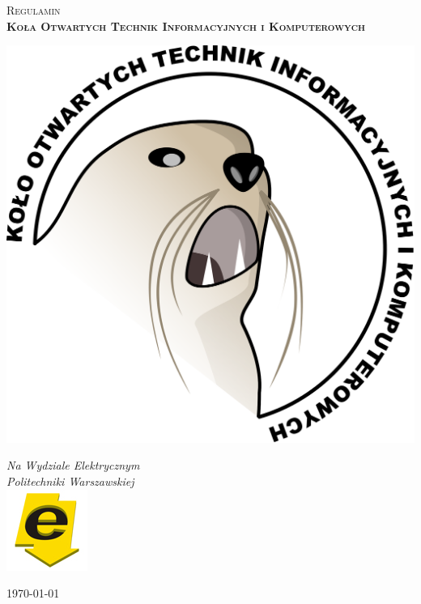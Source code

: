 \documentclass[a4paper,11pt]{article}
\begin{document}
\begin{titlepage}

\begin{center}
	\vspace{20pt}
	\begin{doublespace}
		\begin{huge}
			\textsc{Regulamin \\ \textbf{Koła Otwartych Technik Informacyjnych i Komputerowych}}
		\end{huge}
	\end{doublespace}
	
	\vspace{40pt}
	
	\includegraphics[scale=0.4]{duzy-kotik.png}
	
	\vfill
	
	\textit{Na Wydziale Elektrycznym} \\
	\textit{Politechniki Warszawskiej} \\
	\vspace{10pt}
	\includegraphics[scale=0.3]{ee.jpg}
		
	\vfill
	
	\today
\end{center}

\end{titlepage}
\end{document}
